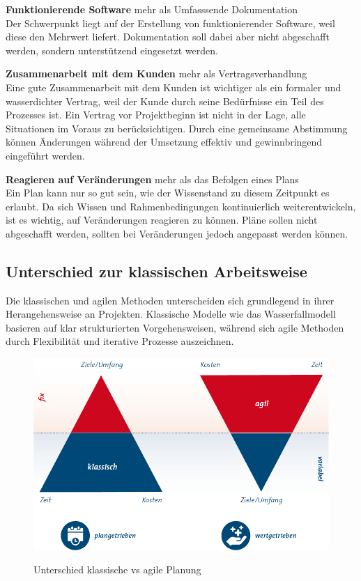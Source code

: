 \documentclass[ngerman]{seminarvorlage}
\begin{document}
\textbf{Funktionierende Software} mehr als Umfasssende Dokumentation\\
Der Schwerpunkt liegt auf der Erstellung von funktionierender Software, weil diese den Mehrwert liefert. Dokumentation soll dabei aber nicht abgeschafft werden, sondern unterstützend eingesetzt werden.

\textbf{Zusammenarbeit mit dem Kunden} mehr als Vertragsverhandlung\\
Eine gute Zusammenarbeit mit dem Kunden ist wichtiger als ein formaler und wasserdichter Vertrag, weil der Kunde durch seine Bedürfnisse ein Teil des Prozesses ist. Ein Vertrag vor Projektbeginn ist nicht in der Lage, alle Situationen im Voraus zu berücksichtigen. Durch eine gemeinsame Abstimmung können Änderungen während der Umsetzung effektiv und gewinnbringend eingeführt werden.

\textbf{Reagieren auf Veränderungen} mehr als das Befolgen eines Plans\\
Ein Plan kann nur so gut sein, wie der Wissenstand zu diesem Zeitpunkt es erlaubt. Da sich Wissen und Rahmenbedingungen kontinuierlich weiterentwickeln, ist es wichtig, auf Veränderungen reagieren zu können. Pläne sollen nicht abgeschafft werden, sollten bei Veränderungen jedoch angepasst werden können.\\

\subsection{Unterschied zur klassischen Arbeitsweise}
Die klassischen und agilen Methoden unterscheiden sich grundlegend in ihrer Herangehensweise an Projekten. Klassische Modelle wie das Wasserfallmodell basieren auf klar strukturierten Vorgehensweisen, während sich agile Methoden durch Flexibilität und iterative Prozesse auszeichnen.\cite{Ant.}\\

\begin{figure}[h]
\centering
\includegraphics[scale=.5]{"images/klassisch_agil.png"}
\caption{Unterschied klassische vs agile Planung}
\label{agil}
\cite{Consileon.2021}
\end{figure}
\end{document}
